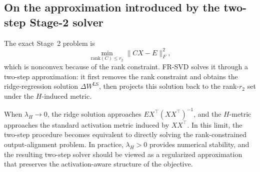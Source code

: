 \documentclass[a4paper,fleqn]{cas-dc}
\begin{document}
\subsection{On the approximation introduced by the two-step Stage-2 solver}\label{app:two-step-approximation}

The exact Stage~2 problem is
\begin{equation}
\min_{\mathrm{rank}(C)\le r_2} \|CX-E\|_F^2,
\end{equation}
which is nonconvex because of the rank constraint. FR-SVD solves it through a two-step approximation: it first removes the rank constraint and obtains the ridge-regression solution $\Delta W^{\mathrm{LS}}$, then projects this solution back to the rank-$r_2$ set under the $H$-induced metric.

When $\lambda_H \to 0$, the ridge solution approaches $E X^{\!\top}\!(X X^{\!\top})^{-1}$, and the $H$-metric approaches the standard activation metric induced by $XX^{\top}$. In this limit, the two-step procedure becomes equivalent to directly solving the rank-constrained output-alignment problem. In practice, $\lambda_H > 0$ provides numerical stability, and the resulting two-step solver should be viewed as a regularized approximation that preserves the activation-aware structure of the objective.


\printcredits


\end{document}
